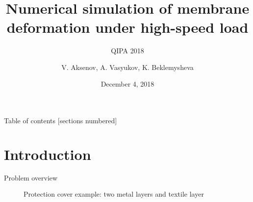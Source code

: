 \documentclass[10pt]{beamer}
\title{Numerical simulation of membrane deformation under high-speed load}
\subtitle{QIPA 2018}
\date{December 4, 2018}
\author{V. Aksenov, A. Vasyukov, K. Beklemysheva  }
\institute{Moscow Institute of Physics and Technology}
\numberwithin{equation}{subsection}
\begin{document}
\maketitle

\begin{frame}{Table of contents}
  [sections numbered]
  \tableofcontents[hideallsubsections]
\end{frame}

\section{Introduction}

\begin{frame}[fragile]{Problem overview}
    \begin{figure}
    \begin{minipage}{0.49\textwidth}
    	\noindent{}
        \caption{Protection cover example: two metal layers and textile layer}
	\end{minipage}
    \hfill
    \begin{minipage}{0.33\textwidth}
    	\noindent{}

\end{minipage}
\end{figure}
\end{frame}
\end{document}
